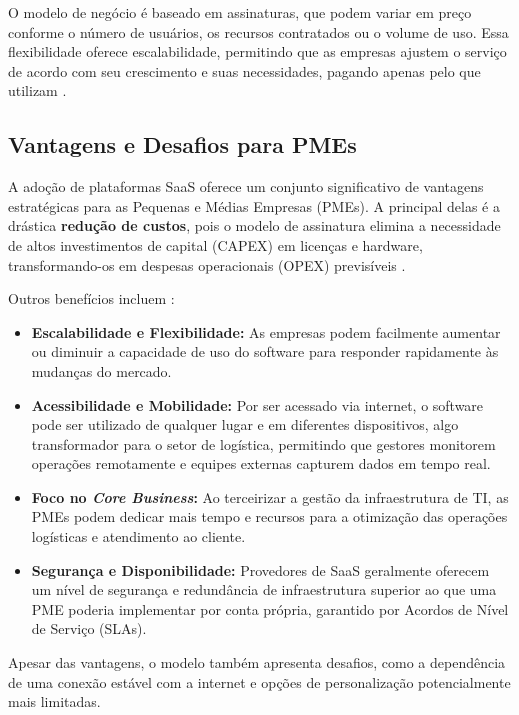 O modelo de negócio é baseado em assinaturas, que podem variar em preço conforme o número de usuários, os recursos contratados ou o volume de uso. Essa flexibilidade oferece escalabilidade, permitindo que as empresas ajustem o serviço de acordo com seu crescimento e suas necessidades, pagando apenas pelo que utilizam \cite{prologapp2024saas}.

\subsection{Vantagens e Desafios para PMEs}

A adoção de plataformas SaaS oferece um conjunto significativo de vantagens estratégicas para as Pequenas e Médias Empresas (PMEs). A principal delas é a drástica \textbf{redução de custos}, pois o modelo de assinatura elimina a necessidade de altos investimentos de capital (CAPEX) em licenças e hardware, transformando-os em despesas operacionais (OPEX) previsíveis \cite{praxio2021vantagens}.

Outros benefícios incluem \cite{prologapp2024saas, praxio2021vantagens}:
\begin{itemize}
    \item \textbf{Escalabilidade e Flexibilidade:} As empresas podem facilmente aumentar ou diminuir a capacidade de uso do software para responder rapidamente às mudanças do mercado.
    \item \textbf{Acessibilidade e Mobilidade:} Por ser acessado via internet, o software pode ser utilizado de qualquer lugar e em diferentes dispositivos, algo transformador para o setor de logística, permitindo que gestores monitorem operações remotamente e equipes externas capturem dados em tempo real.
    \item \textbf{Foco no \textit{Core Business}:} Ao terceirizar a gestão da infraestrutura de TI, as PMEs podem dedicar mais tempo e recursos para a otimização das operações logísticas e atendimento ao cliente.
    \item \textbf{Segurança e Disponibilidade:} Provedores de SaaS geralmente oferecem um nível de segurança e redundância de infraestrutura superior ao que uma PME poderia implementar por conta própria, garantido por Acordos de Nível de Serviço (SLAs).
\end{itemize}

Apesar das vantagens, o modelo também apresenta desafios, como a dependência de uma conexão estável com a internet e opções de personalização potencialmente mais limitadas.

